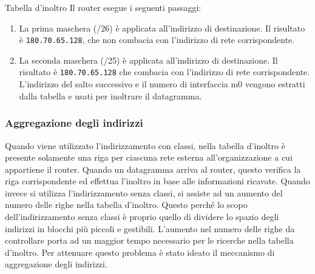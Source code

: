 \begin{Example}{Tabella d'inoltro}{}
    Il router esegue i seguenti passaggi:
    \begin{enumerate}
        \item La prima maschera (/26) è applicata all'indirizzo di destinazione. Il risultato è \texttt{180.70.65.128}, che non combacia con l'indirizzo di rete corrispondente.
        \item La seconda maschera (/25) è applicata all'indirizzo di destinazione. Il risultato è \texttt{180.70.65.128} che combacia con l'indirizzo di rete corrispondente. L'indirizzo del salto successivo e il numero di interfaccia m0 vengono estratti dalla tabella e usati per inoltrare il datagramma.
    \end{enumerate}
\end{Example}

\subsubsection{Aggregazione degli indirizzi}
Quando viene utilizzato l'indirizzamento con classi, nella tabella d'inoltro è presente solamente una riga per ciascuna rete esterna all'organizzazione a cui appartiene il router. Quando un datagramma arriva al router, questo verifica la riga corrispondente ed effettua l'inoltro in base alle informazioni ricavate. Quando invece si utilizza l'indirizzamento senza classi, si assiste ad un aumento del numero delle righe nella tabella d'inoltro. Questo perché lo scopo dell'indirizzamento senza classi è proprio quello di dividere lo spazio degli indirizzi in blocchi più piccoli e gestibili. L'aumento nel numero delle righe da controllare porta ad un maggior tempo necessario per le ricerche nella tabella d'inoltro. Per attenuare questo problema è stato ideato il meccanismo di aggregazione degli indirizzi. 


